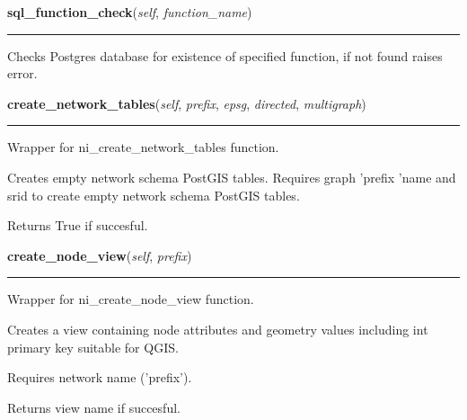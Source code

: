 \hspace{.8\funcindent}\begin{boxedminipage}{\funcwidth}

    \raggedright \textbf{sql\_function\_check}(\textit{self}, \textit{function\_name})

    \vspace{-1.5ex}

    \rule{\textwidth}{0.5\fboxrule}
\setlength{\parskip}{2ex}
    Checks Postgres database for existence of specified function, if not 
    found raises error.

\setlength{\parskip}{1ex}
    \end{boxedminipage}

    \label{nx_pgnet:nisql:create_network_tables}

    \vspace{0.5ex}

\hspace{.8\funcindent}\begin{boxedminipage}{\funcwidth}

    \raggedright \textbf{create\_network\_tables}(\textit{self}, \textit{prefix}, \textit{epsg}, \textit{directed}, \textit{multigraph})

    \vspace{-1.5ex}

    \rule{\textwidth}{0.5\fboxrule}
\setlength{\parskip}{2ex}
    Wrapper for ni\_create\_network\_tables function.

    Creates empty network schema PostGIS tables. Requires graph 'prefix 
    'name and srid to create empty network schema PostGIS tables.

    Returns True if succesful.

\setlength{\parskip}{1ex}
    \end{boxedminipage}

    \label{nx_pgnet:nisql:create_node_view}

    \vspace{0.5ex}

\hspace{.8\funcindent}\begin{boxedminipage}{\funcwidth}

    \raggedright \textbf{create\_node\_view}(\textit{self}, \textit{prefix})

    \vspace{-1.5ex}

    \rule{\textwidth}{0.5\fboxrule}
\setlength{\parskip}{2ex}
    Wrapper for ni\_create\_node\_view function.

    Creates a view containing node attributes and geometry values including
    int primary key suitable for QGIS.

    Requires network name ('prefix').

    Returns view name if succesful.

\setlength{\parskip}{1ex}
    \end{boxedminipage}

